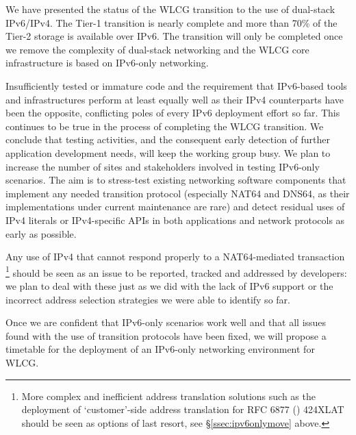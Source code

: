 
We have presented the status of the WLCG transition to the use of dual-stack IPv6/IPv4. The Tier-1 transition is nearly complete and 
more than 70\% of the Tier-2 storage is available over IPv6. The transition will only be completed once we remove the complexity of
dual-stack networking and the WLCG core infrastructure is based on IPv6-only networking.


Insufficiently tested or immature code and the requirement that IPv6-based
tools and infrastructures perform at least equally well as their IPv4
counterparts have been the opposite, conflicting poles of every IPv6
deployment effort so far. This continues to be true in the process
of completing the WLCG transition. We conclude that
testing activities, and the consequent early detection of further application
development needs, will keep the working group busy. We plan
to increase the number of sites and stakeholders involved in testing IPv6-only 
scenarios. The aim is to stress-test existing networking software components
that implement any needed transition protocol (especially NAT64 and DNS64, as 
their implementations under current maintenance are rare) and detect
residual uses of IPv4 literals or IPv4-specific APIs in both applications and
network protocols as early as possible.\par
Any use of IPv4 that cannot respond properly to a NAT64-mediated
transaction
\footnote{More complex and inefficient address
translation solutions such as the deployment of `customer'-side address
translation for RFC 6877 (\cite{rfc}) 424XLAT should be
seen as options of last resort, see \S \ref{ssec:ipv6onlymove} above.}
should be seen as an issue to be reported, tracked and
addressed by developers: we plan to deal with these just as we did
with the lack of IPv6 support or the incorrect address selection
strategies we were able to identify so far.\par
Once we are confident that IPv6-only scenarios work well and that
all issues found with the use of transition protocols have been fixed, we will
propose a timetable for the deployment of an IPv6-only networking 
environment for WLCG.
